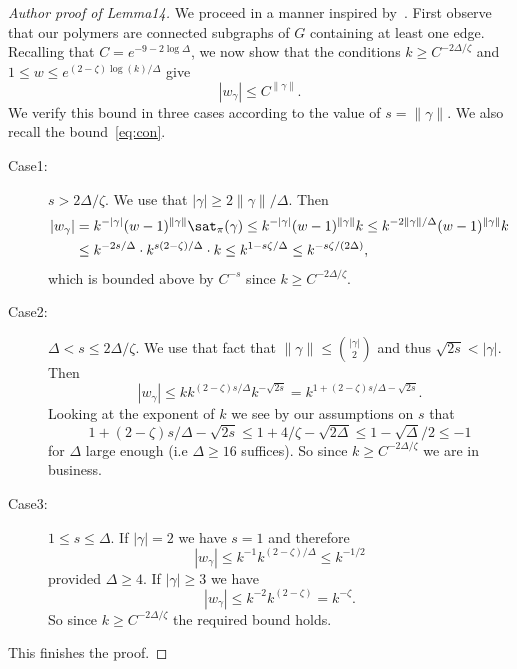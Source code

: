 \begin{proof}[Author proof of Lemma14]
We proceed in a manner inspired by~\cite[Theorem2.4]{BCHPT19}. First observe that our polymers are connected subgraphs of $G$ containing at least one edge. Recalling that $C=e^{-9-2\log\Delta}$, we now show that the conditions $k\geq C^{-2\Delta/\zeta}$ and $1\leq w\leq e^{(2-\zeta)\log(k)/\Delta}$ give
\begin{equation}|w_\gamma|\leq C^{\|\gamma\|}.\label{eq:weight bound}\end{equation}
We verify this bound in three cases according to the value of $s=\|\gamma\|$. We also recall the bound~\eqref{eq:con}.
\begin{description}
\item[Case1:] $s>2\Delta/\zeta$. We use that $|\gamma|\geq2\|\gamma\|/\Delta$. Then
\begin{align*}|w_\gamma|&=k^{-|\gamma|}(w-1)^{\|\gamma\|}\sat_\pi(\gamma)\leq k^{-|\gamma|}(w-1)^{\|\gamma\|}k\leq k^{-2\|\gamma\|/\Delta}(w-1)^{\|\gamma\|}k\\&\leq k^{-2s/\Delta}\cdot k^{s(2-\zeta)/\Delta}\cdot k\leq k^{1-s\zeta/\Delta}\leq k^{-s\zeta/(2\Delta)},\end{align*}
which is bounded above by $C^{-s}$ since $k\geq C^{-2\Delta/\zeta}$.
\item[Case2:] $\Delta<s\leq2\Delta/\zeta$. We use that fact that $\|\gamma\|\leq\binom{|\gamma|}2$ and thus $\sqrt{2s}<|\gamma|$. Then
\[|w_\gamma|\leq kk^{(2-\zeta)s/\Delta}k^{-\sqrt{2s}}=k^{1+(2-\zeta)s/\Delta-\sqrt{2s}}.\]
Looking at the exponent of $k$ we see by our assumptions on $s$ that
\[1+(2-\zeta)s/\Delta-\sqrt{2s}\leq1+4/\zeta-\sqrt{2\Delta}\leq1-\sqrt\Delta/2\leq-1\]
for $\Delta$ large enough (i.e $\Delta\geq16$ suffices). So since $k\geq C^{-2\Delta/\zeta}$ we are in business.
\item[Case3:] $1\leq s\leq\Delta$. If $|\gamma|=2$ we have $s=1$ and therefore
\[|w_\gamma|\leq k^{-1}k^{(2-\zeta)/\Delta}\leq k^{-1/2}\]
provided $\Delta\geq4$. If $|\gamma|\geq3$ we have
\[|w_\gamma|\leq k^{-2}k^{(2-\zeta)}=k^{-\zeta}.\]
So since $k\geq C^{-2\Delta/\zeta}$ the required bound holds.
\end{description}
This finishes the proof.
\end{proof}
